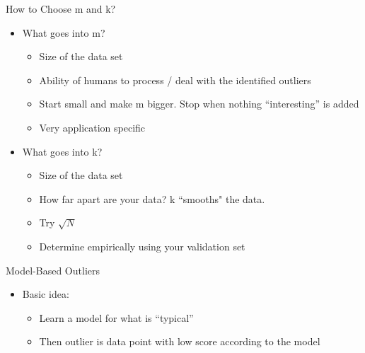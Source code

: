 \documentclass[aspectratio=169]{beamer}
\begin{document}
\begin{frame}{How to Choose m and k?}

\begin{itemize}
\item What goes into m?
	\begin{itemize}
	\item Size of the data set
	\item Ability of humans to process / deal with the identified outliers
	\item Start small and make m bigger. Stop when nothing ``interesting'' is added
	\item Very application specific
	\end{itemize}
\item What goes into k?
	\begin{itemize}
	\item Size of the data set
	\item How far apart are your data? k ``smooths" the data. %
	\item Try $\sqrt{N}$
	\item Determine empirically using your validation set
	\end{itemize}
\end{itemize}

\end{frame}
\begin{frame}{Model-Based Outliers}
\begin{itemize}
\item Basic idea:
	\begin{itemize}
	\item Learn a model for what is ``typical''
	\item Then outlier is data point with low score according to the model
	\end{itemize}
\end{itemize}

\end{frame}
\end{document}
